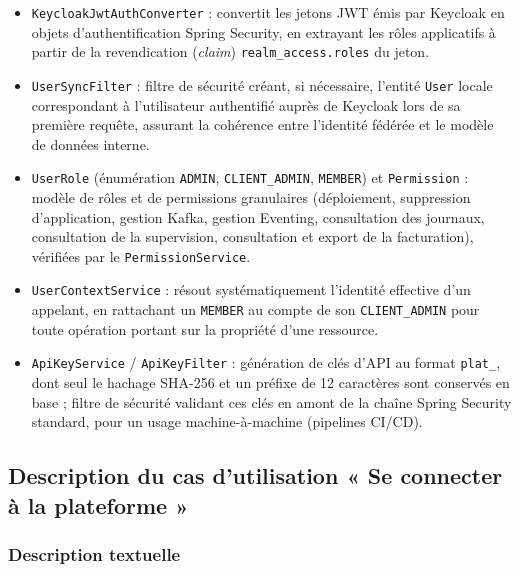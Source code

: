 \begin{itemize}
    \item \texttt{KeycloakJwtAuthConverter} : convertit les jetons JWT émis par Keycloak en objets d'authentification Spring Security, en extrayant les rôles applicatifs à partir de la revendication (\textit{claim}) \texttt{realm\_access.roles} du jeton.
    \item \texttt{UserSyncFilter} : filtre de sécurité créant, si nécessaire, l'entité \texttt{User} locale correspondant à l'utilisateur authentifié auprès de Keycloak lors de sa première requête, assurant la cohérence entre l'identité fédérée et le modèle de données interne.
    \item \texttt{UserRole} (énumération \texttt{ADMIN}, \texttt{CLIENT\_ADMIN}, \texttt{MEMBER}) et \texttt{Permission} : modèle de rôles et de permissions granulaires (déploiement, suppression d'application, gestion Kafka, gestion Eventing, consultation des journaux, consultation de la supervision, consultation et export de la facturation), vérifiées par le \texttt{PermissionService}.
    \item \texttt{UserContextService} : résout systématiquement l'identité \og effective \fg{} d'un appelant, en rattachant un \texttt{MEMBER} au compte de son \texttt{CLIENT\_ADMIN} pour toute opération portant sur la propriété d'une ressource.
    \item \texttt{ApiKeyService} / \texttt{ApiKeyFilter} : génération de clés d'API au format \texttt{plat\_<chaîne aléatoire>}, dont seul le hachage SHA-256 et un préfixe de 12 caractères sont conservés en base ; filtre de sécurité validant ces clés en amont de la chaîne Spring Security standard, pour un usage machine-à-machine (pipelines CI/CD).
\end{itemize}

\subsection{Description du cas d'utilisation « Se connecter à la plateforme »}

\subsubsection{Description textuelle}

